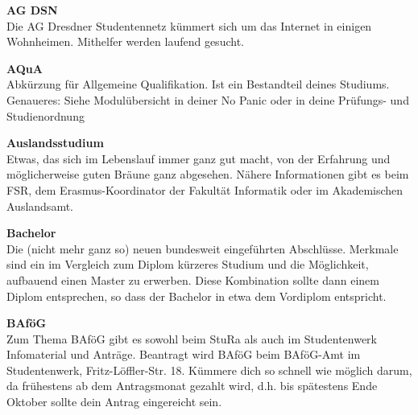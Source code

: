 
\begin{multicols}{2}

\textbf{AG DSN} \\
Die AG Dresdner Studentennetz kümmert sich um das Internet in einigen Wohnheimen.
Mithelfer werden laufend gesucht. 



\textbf{AQuA} \\
Abkürzung für Allgemeine Qualifikation.
Ist ein Bestandteil deines Studiums.
Genaueres:
Siehe Modulübersicht in deiner No Panic oder in deine Prüfungs- und Studienordnung %


\textbf{Auslandsstudium} \\
Etwas, das sich im Lebenslauf immer ganz gut macht, von der Erfahrung und möglicherweise guten Bräune ganz abgesehen.
Nähere Informationen gibt es beim FSR, dem Erasmus-Koordinator der Fakultät Informatik oder im Akademischen Auslandsamt. 

\textbf{Bachelor} \\
Die (nicht mehr ganz so) neuen bundesweit eingeführten Abschlüsse. %
Merkmale sind ein im Vergleich zum Diplom kürzeres Studium und die Möglichkeit, aufbauend einen Master zu erwerben. Diese Kombination sollte dann einem Diplom entsprechen, so dass der Bachelor in etwa dem Vordiplom entspricht.

\vfill\columnbreak

\textbf{BAföG} \\
Zum Thema BAföG gibt es sowohl beim StuRa als auch im Studentenwerk Infomaterial und Anträge.
Beantragt wird BAföG beim BAföG-Amt im Studentenwerk, Fritz-Löffler-Str. 18.
Kümmere dich so schnell wie möglich darum, da frühestens ab dem Antragsmonat gezahlt wird, d.h. bis spätestens Ende Oktober sollte dein Antrag eingereicht sein. 


\end{multicols}
